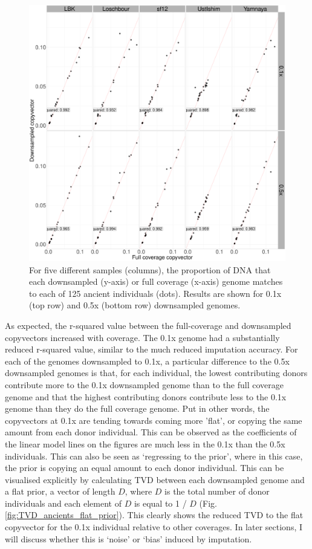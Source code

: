 \begin{figure}[htp]
    \centering
    \includegraphics[width=1.0\textwidth]{../images/chapter1/CP_correlation_allSamples_0.1x_0.5x_30x.pdf}
    \caption{For five different samples (columns), the proportion of DNA that each downsampled (y-axis) or full coverage (x-axis) genome matches to each of 125 ancient individuals (dots). Results are shown for 0.1x (top row) and 0.5x (bottom row) downsampled genomes.}
    \label{fig:CP_correlation_allSamples_0.1x_0.5x_30x}
\end{figure}

As expected, the r-squared value between the full-coverage and downsampled copyvectors increased with coverage. The 0.1x genome had a substantially reduced r-squared value, similar to the much reduced imputation accuracy. For each of the genomes downsampled to 0.1x, a particular difference to the 0.5x downsampled genomes is that, for each individual, the lowest contributing donors contribute more to the 0.1x downsampled genome than to the full coverage genome and that the highest contributing donors contribute less to the 0.1x genome than they do the full coverage genome. Put in other words, the copyvectors at 0.1x are tending towards coming more 'flat', or copying the same amount from each donor individual. This can be observed as the coefficients of the linear model lines on the figures are much less in the 0.1x than the 0.5x individuals. This can also be seen as `regressing to the prior', where in this case, the prior is copying an equal amount to each donor individual. This can be visualised explicitly by calculating TVD between each downsampled genome and a flat prior, a vector of length $D$, where $D$ is the total number of donor individuals and each element of $D$ is equal to 1 / $D$ (Fig. \ref{fig:TVD_ancients_flat_prior}). This clearly shows the reduced TVD to the flat copyvector for the 0.1x individual relative to other coverages. In later sections, I will discuss whether this is `noise' or `bias' induced by imputation. 

